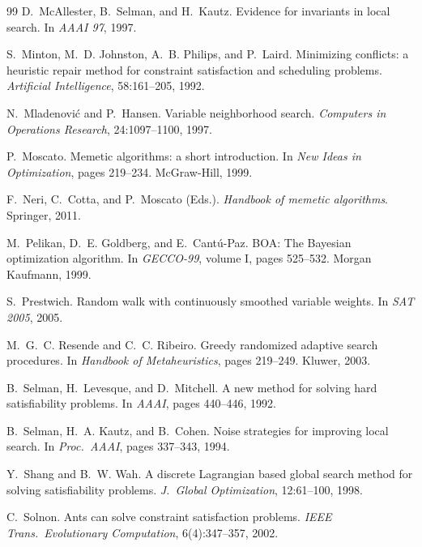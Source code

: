 \documentclass[12pt,a4paper]{book}
\begin{document}
\begin{thebibliography}{99}
D.~McAllester, B.~Selman, and H.~Kautz.
\newblock Evidence for invariants in local search.
\newblock In \textit{AAAI 97}, 1997.

S.~Minton, M.~D. Johnston, A.~B. Philips, and P.~Laird.
\newblock Minimizing conflicts: a heuristic repair method for constraint satisfaction and scheduling problems.
\newblock \textit{Artificial Intelligence}, 58:161--205, 1992.

N.~Mladenović and P.~Hansen.
\newblock Variable neighborhood search.
\newblock \textit{Computers in Operations Research}, 24:1097--1100, 1997.

P.~Moscato.
\newblock Memetic algorithms: a short introduction.
\newblock In \textit{New Ideas in Optimization}, pages 219--234. McGraw-Hill, 1999.

F.~Neri, C.~Cotta, and P.~Moscato (Eds.).
\newblock \textit{Handbook of memetic algorithms}.
\newblock Springer, 2011.

M.~Pelikan, D.~E. Goldberg, and E.~Cantú-Paz.
\newblock BOA: The Bayesian optimization algorithm.
\newblock In \textit{GECCO-99}, volume I, pages 525--532. Morgan Kaufmann, 1999.

S.~Prestwich.
\newblock Random walk with continuously smoothed variable weights.
\newblock In \textit{SAT 2005}, 2005.

M.~G.~C. Resende and C.~C. Ribeiro.
\newblock Greedy randomized adaptive search procedures.
\newblock In \textit{Handbook of Metaheuristics}, pages 219--249. Kluwer, 2003.

B.~Selman, H.~Levesque, and D.~Mitchell.
\newblock A new method for solving hard satisfiability problems.
\newblock In \textit{AAAI}, pages 440--446, 1992.

B.~Selman, H.~A. Kautz, and B.~Cohen.
\newblock Noise strategies for improving local search.
\newblock In \textit{Proc.\ AAAI}, pages 337--343, 1994.

Y.~Shang and B.~W. Wah.
\newblock A discrete Lagrangian based global search method for solving satisfiability problems.
\newblock \textit{J.\ Global Optimization}, 12:61--100, 1998.

C.~Solnon.
\newblock Ants can solve constraint satisfaction problems.
\newblock \textit{IEEE Trans.\ Evolutionary Computation}, 6(4):347--357, 2002.


\end{thebibliography}
\end{document}
